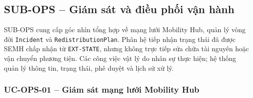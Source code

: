 \subsection{SUB-OPS -- Giám sát và điều phối vận hành}

SUB-OPS cung cấp góc nhìn tổng hợp về mạng lưới Mobility Hub, quản lý vòng đời \texttt{Incident} và \texttt{RedistributionPlan}. Phân hệ tiếp nhận trạng thái đã được SEMH chấp nhận từ \texttt{EXT-STATE}, nhưng không trực tiếp sửa chữa tài nguyên hoặc vận chuyển phương tiện. Các công việc vật lý do nhân sự thực hiện; hệ thống quản lý thông tin, trạng thái, phê duyệt và lịch sử xử lý.

\subsubsection{UC-OPS-01 -- Giám sát mạng lưới Mobility Hub}


